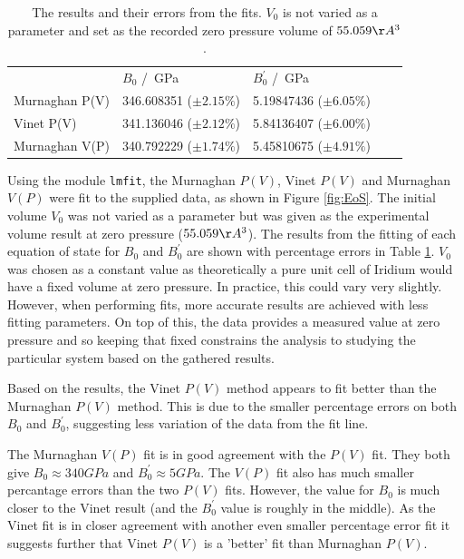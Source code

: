 \documentclass[12pt]{article}
\begin{document}
		
		\begin{table}[h!!!]
			\centering
			\begin{tabular}{l|l|l|ll}
				\cline{2-3}
				& $B_0$ /\SI{}{\GPa}                 & $B_0^{\prime}$ /\SI{}{\GPa}            &  &  \\ \cline{1-3}
				\multicolumn{1}{|l|}{Murnaghan P(V)} & 346.608351 ($\pm 2.15\%$) & 5.19847436 ($\pm 6.05\%$) &  &  \\ \cline{1-3}
				\multicolumn{1}{|l|}{Vinet P(V)}     & 341.136046 ($\pm 2.12\%$) & 5.84136407 ($\pm 6.00\%$) &  &  \\ \cline{1-3}
				\multicolumn{1}{|l|}{Murnaghan V(P)} & 340.792229 ($\pm 1.74\%$) & 5.45810675 ($\pm 4.91\%$) &  &  \\ \cline{1-3}
			\end{tabular}
			\caption{The results and their errors from the fits. $V_0$ is not varied as a parameter and set as the recorded zero pressure volume of $55.059 \AA^3$.}
			\label{tab:results}
		\end{table}
	
	\newpage
	\noindent Using the module \texttt{lmfit}, the Murnaghan $P(V)$, Vinet $P(V)$ and Murnaghan $V(P)$ were fit to the supplied data, as shown in Figure \ref{fig:EoS}. The initial volume $V_0$ was not varied as a parameter but was given as the experimental volume result at zero pressure ($55.059 \AA^3$). The results from the fitting of each equation of state for $B_0$ and $B_0^{\prime}$ are shown with percentage errors in Table \ref{tab:results}. $V_0$ was chosen as a constant value as theoretically a pure unit cell of Iridium would have a fixed volume at zero pressure. In practice, this could vary very slightly. However, when performing fits, more accurate results are achieved with less fitting parameters. On top of this, the data provides a measured value at zero pressure and so keeping that fixed constrains the analysis to studying the particular system based on the gathered results.
	
	\bigskip
	
	\noindent Based on the results, the Vinet $P(V)$ method appears to fit better than the Murnaghan $P(V)$ method. This is due to the smaller percentage errors on both $B_0$ and $B_0^{\prime}$, suggesting less variation of the data from the fit line.
	
	\bigskip
	
	\noindent The Murnaghan $V(P)$ fit is in good agreement with the $P(V)$ fit. They both give $B_0 \approx 340 GPa$ and $B_0^{\prime} \approx 5 GPa$. The $V(P)$ fit also has much smaller percantage errors than the two $P(V)$ fits. However, the value for $B_0$ is much closer to the Vinet result (and the $B_0^{\prime}$ value is roughly in the middle).  As the Vinet fit is in closer agreement with another even smaller percentage error fit it suggests further that Vinet $P(V)$ is a 'better' fit than Murnaghan $P(V)$.
	
\end{document}
